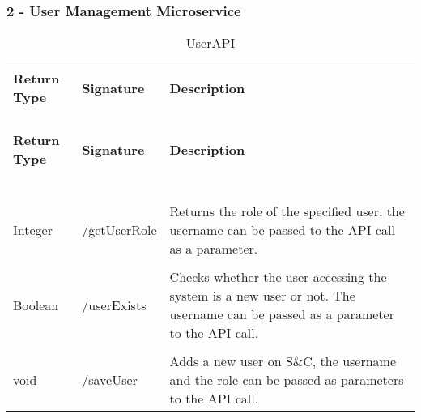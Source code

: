 \subsubsection{2 - User Management Microservice}

\begin{longtable}{p{}p{}p{}}
    \caption{UserAPI}
    \vspace{0.5em}\\
    \hline
    \vspace{0.5em}\\
    \textbf{Return Type} & \textbf{Signature} & \textbf{Description} \\
    \vspace{0.5em}\\
    \hline
    \vspace{0.5em}\\
    \endfirsthead
    \vspace{0.5em}\\
    \hline
    \vspace{0.5em}\\
    \textbf{Return Type} & \textbf{Signature} & \textbf{Description} \\
    \vspace{0.5em}\\
    \hline
    \vspace{0.5em}\\
    \endhead
    
    \vspace{0.5em}\\
    \hline
    \vspace{0.5em}\\
    \endfoot
    
    \vspace{0.5em}\\
    \hline
    \vspace{0.5em}\\
    \endlastfoot
    
    Integer &
    /getUserRole &
    Returns the role of the specified user, the username can be passed to the API call as a parameter. \\
    \vspace{0.5em}\\
    Boolean &
    /userExists &
    Checks whether the user accessing the system is a new user or not. The username can be passed as a parameter to the API call. \\
    \vspace{0.5em}\\
    void &
    /saveUser &
    Adds a new user on S\&C, the username and the role can be passed as parameters to the API call. \\

\end{longtable}

